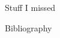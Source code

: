 \documentclass{beamer}
\begin{document}
\begin{frame}{Stuff I missed}

\end{frame}

\begin{frame}{Bibliography}
\end{frame}
\end{document}
